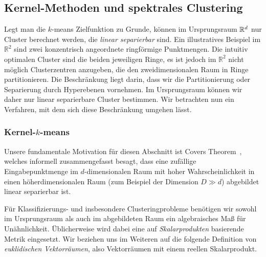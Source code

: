 \subsection{Kernel-Methoden und spektrales Clustering}
\label{subsection:basics:kernel-spectral}

Legt man die $k$-means Zielfunktion zu Grunde, können im Ursprungsraum $\mathbb{R}^{d}$ nur Cluster berechnet werden, die \emph{linear
separierbar} sind. Ein illustratives Beispiel im $\mathbb{R}^2$ sind zwei konzentrisch angeordnete ringförmige Punktmengen.
Die intuitiv optimalen Cluster sind die beiden jeweiligen Ringe, es ist jedoch im $\mathbb{R}^2$ nicht
möglich Clusterzentren anzugeben, die den zweidimensionalen Raum in Ringe partitionieren. Die Beschränkung liegt darin, dass
wir die Partitionierung oder Separierung durch Hyperebenen vornehmen. Im Ursprungsraum können wir daher nur linear separierbare
Cluster bestimmen. Wir betrachten nun ein Verfahren, mit dem sich diese Beschränkung umgehen lässt.

\subsubsection{Kernel-\texorpdfstring{$k$}{k}-means}

Unsere fundamentale Motivation für diesen Abschnitt ist Covers Theorem~\cite{Cover65}, welches informell zusammengefasst besagt,
dass eine zufällige Eingabepunktmenge im $d$-dimensionalen Raum mit hoher Wahrscheinlichkeit in einen höherdimensionalen
Raum (zum Beispiel der Dimension $D \gg d$) abgebildet linear separierbar ist.

Für Klassifizierungs- und insbesondere Clusteringprobleme benötigen wir sowohl im Ursprungsraum als auch im abgebildeten Raum
ein algebraisches Maß für Unähnlichkeit. Üblicherweise wird dabei eine auf \emph{Skalarprodukten} basierende Metrik eingesetzt.
Wir beziehen uns im Weiteren auf die folgende Definition von \emph{euklidischen Vektorräumen}, also Vektorräumen mit einem
reellen Skalarprodukt.

